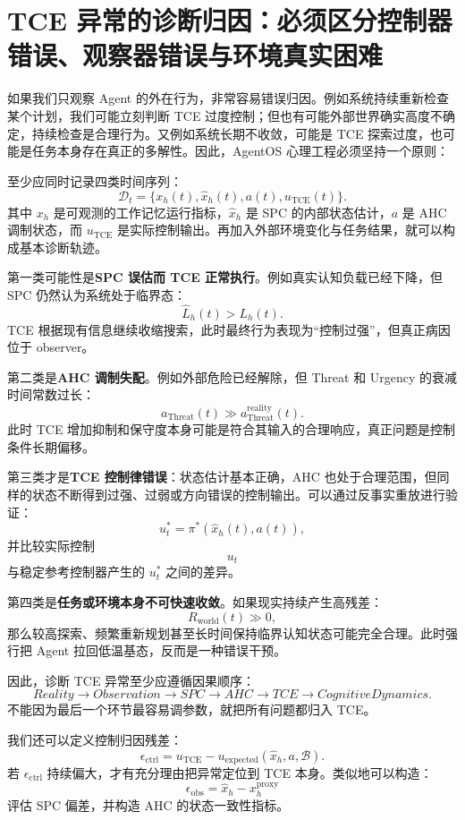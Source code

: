\section{TCE 异常的诊断归因：必须区分控制器错误、观察器错误与环境真实困难}

如果我们只观察 Agent 的外在行为，非常容易错误归因。例如系统持续重新检查某个计划，我们可能立刻判断 TCE 过度控制；但也有可能外部世界确实高度不确定，持续检查是合理行为。又例如系统长期不收敛，可能是 TCE 探索过度，也可能是任务本身存在真正的多解性。因此，AgentOS 心理工程必须坚持一个原则：
\begin{statementbox}
\centering
{}
\end{statementbox}

至少应同时记录四类时间序列：
\[
\mathcal D_t
=
\{
x_h(t),
\hat x_h(t),
a(t),
u_{\mathrm{TCE}}(t)
\}.
\]
其中 \(x_h\) 是可观测的工作记忆运行指标，\(\hat x_h\) 是 SPC 的内部状态估计，\(a\) 是 AHC 调制状态，而 \(u_{\mathrm{TCE}}\) 是实际控制输出。再加入外部环境变化与任务结果，就可以构成基本诊断轨迹。

第一类可能性是\textbf{SPC 误估而 TCE 正常执行}。例如真实认知负载已经下降，但 SPC 仍然认为系统处于临界态：
\[
\hat L_h(t)>L_h(t).
\]
TCE 根据现有信息继续收缩搜索，此时最终行为表现为“控制过强”，但真正病因位于 observer。

第二类是\textbf{AHC 调制失配}。例如外部危险已经解除，但 Threat 和 Urgency 的衰减时间常数过长：
\[
a_{\mathrm{Threat}}(t)
\gg
a_{\mathrm{Threat}}^{\mathrm{reality}}(t).
\]
此时 TCE 增加抑制和保守度本身可能是符合其输入的合理响应，真正问题是控制条件长期偏移。

第三类才是\textbf{TCE 控制律错误}：状态估计基本正确，AHC 也处于合理范围，但同样的状态不断得到过强、过弱或方向错误的控制输出。可以通过反事实重放进行验证：
\[
u^\ast_t
=
\pi^\ast
(\hat x_h(t),a(t)),
\]
并比较实际控制
\[
u_t
\]
与稳定参考控制器产生的 \(u^\ast_t\) 之间的差异。

第四类是\textbf{任务或环境本身不可快速收敛}。如果现实持续产生高残差：
\[
R_{\mathrm{world}}(t)\gg 0,
\]
那么较高探索、频繁重新规划甚至长时间保持临界认知状态可能完全合理。此时强行把 Agent 拉回低温基态，反而是一种错误干预。

因此，诊断 TCE 异常至少应遵循因果顺序：
\[
Reality
\rightarrow
Observation
\rightarrow
SPC
\rightarrow
AHC
\rightarrow
TCE
\rightarrow
CognitiveDynamics.
\]
不能因为最后一个环节最容易调参数，就把所有问题都归入 TCE。

我们还可以定义控制归因残差：
\[
\epsilon_{\mathrm{ctrl}}
=
u_{\mathrm{TCE}}
-
u_{\mathrm{expected}}
(\hat x_h,a,\mathcal B).
\]
若 \(\epsilon_{\mathrm{ctrl}}\) 持续偏大，才有充分理由把异常定位到 TCE 本身。类似地可以构造：
\[
\epsilon_{\mathrm{obs}}
=
\hat x_h-x_h^{\mathrm{proxy}}
\]
评估 SPC 偏差，并构造 AHC 的状态一致性指标。

